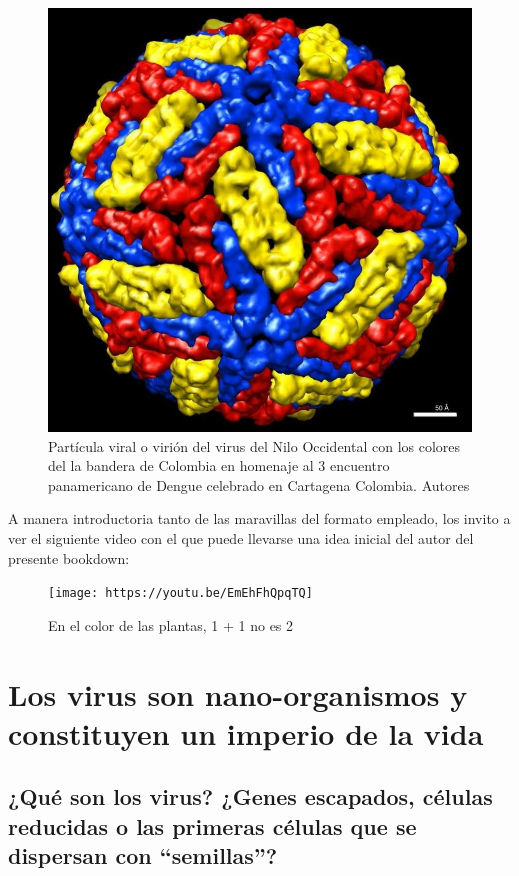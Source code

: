 \documentclass[
  spanish,
]{book}
\begin{document}
\begin{figure}
\centering
\includegraphics{./165496377_134509338676384_4186488905084681632_n.jpg}
\caption{Partícula viral o virión del virus del Nilo Occidental con los colores del la bandera de Colombia en homenaje al 3 encuentro panamericano de Dengue celebrado en Cartagena Colombia. Autores \citet{mukhopadhyay2003structure}}
\end{figure}

A manera introductoria tanto de las maravillas del formato empleado, los invito a ver el siguiente video con el que puede llevarse una idea inicial del autor del presente bookdown:

\begin{figure}
\centering
\texttt{[image: https://youtu.be/EmEhFhQpqTQ]}
\caption{En el color de las plantas, 1 + 1 no es 2}
\end{figure}

\hypertarget{los-virus-son-nano-organismos-y-constituyen-un-imperio-de-la-vida}{%
\chapter{Los virus son nano-organismos y constituyen un imperio de la vida}\label{los-virus-son-nano-organismos-y-constituyen-un-imperio-de-la-vida}}

\hypertarget{quuxe9-son-los-virus-genes-escapados-cuxe9lulas-reducidas-o-las-primeras-cuxe9lulas-que-se-dispersan-con-semillas}{%
\section{¿Qué son los virus? ¿Genes escapados, células reducidas o las primeras células que se dispersan con ``semillas''?}\label{quuxe9-son-los-virus-genes-escapados-cuxe9lulas-reducidas-o-las-primeras-cuxe9lulas-que-se-dispersan-con-semillas}}
\end{document}
